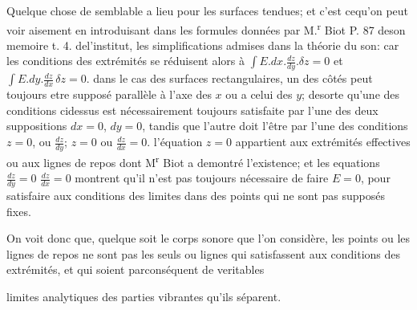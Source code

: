 \documentclass[11pt,a4paper]{article}
\begin{document}
Quelque chose de semblable a lieu pour les surfaces
tendues; et c'est cequ'on peut voir aisement en introduisant
dans les formules données par M.\textsuperscript{r} Biot P. 87 deson memoire
t. 4. del'institut, les simplifications admises dans la théorie du
son: car les conditions des extrémités se réduisent alors
à $\int E.dx.\frac{dz}{dy}.\delta z = 0$ et $\int E.dy.\frac{dz}{dx}\,\delta z = 0$.   dans le cas
des surfaces rectangulaires, un des côtés peut toujours etre
supposé parallèle à l'axe des $x$ ou a celui des $y$;
desorte qu'une des conditions cidessus est nécessairement toujours
satisfaite par l'une des deux suppositions $dx = 0$, $dy = 0$,
tandis que l'autre doit l'être par l'une des conditions
$z = 0$, ou $\frac{dz}{dy}$; $z = 0$ ou $\frac{dz}{dx} = 0$. l'équation $z = 0$ appartient
aux extrémités effectives ou aux lignes de repos dont M\textsuperscript{r}
Biot a demontré l'existence; et les equations $\frac{dz}{dy} = 0$ $\frac{dz}{dx} = 0$
montrent qu'il n'est pas toujours nécessaire de faire
$E = 0$, pour satisfaire aux conditions des limites dans des
points qui ne sont pas supposés fixes.

On voit donc que, quelque soit le corps sonore que l'on
considère, les points ou les lignes de repos ne sont pas
les seuls  ou lignes qui satisfassent aux conditions
des extrémités, et qui soient parconséquent de veritables

limites analytiques des parties vibrantes qu'ils séparent.
\end{document}
